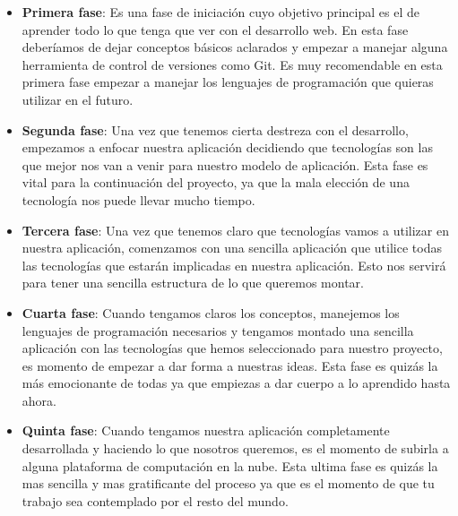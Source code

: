 \begin{itemize}

\item \textbf {Primera fase}: Es una fase de iniciación cuyo objetivo principal es el de aprender todo lo que tenga que ver con el desarrollo web. En esta fase deberíamos de dejar conceptos básicos aclarados y empezar a manejar alguna herramienta de control de versiones como Git. Es muy recomendable en esta primera fase empezar a manejar los lenguajes de programación que quieras utilizar en el futuro.

\item \textbf {Segunda fase}: Una vez que tenemos cierta destreza con el desarrollo, empezamos a enfocar nuestra aplicación decidiendo que tecnologías son las que mejor nos van a venir para nuestro modelo de aplicación. Esta fase es vital para la continuación del proyecto, ya que la mala elección de una tecnología nos puede llevar mucho tiempo.

\item \textbf {Tercera fase}: Una vez que tenemos claro que tecnologías vamos a utilizar en nuestra aplicación, comenzamos con una sencilla aplicación que utilice todas las tecnologías que estarán implicadas en nuestra aplicación. Esto nos servirá para tener una sencilla estructura de lo que queremos montar.

\item \textbf {Cuarta fase}: Cuando tengamos claros los conceptos, manejemos los lenguajes de programación necesarios y tengamos montado una sencilla aplicación con las tecnologías que hemos seleccionado para nuestro proyecto, es momento de empezar a dar forma a nuestras ideas. Esta fase es quizás la más emocionante de todas ya que empiezas a dar cuerpo a lo aprendido hasta ahora. 

\item \textbf {Quinta fase}: Cuando tengamos nuestra aplicación completamente desarrollada y haciendo lo que nosotros queremos, es el momento de subirla a alguna plataforma de computación en la nube. Esta ultima fase es quizás la mas sencilla y mas gratificante del proceso ya que es el momento de que tu trabajo sea contemplado por el resto del mundo.

\end{itemize}



